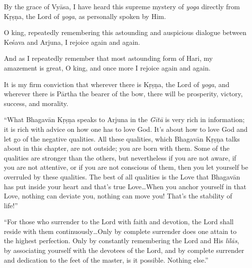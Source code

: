 {By the grace of Vyāsa, I have heard this supreme mystery of \textit{yoga} directly from Kṛṣṇa, the Lord of \textit{yoga}, as personally spoken by Him.}

{O king, repeatedly remembering this astounding and auspicious dialogue between Keśava and Arjuna, I rejoice again and again.}

{And as I repeatedly remember that most astounding form of Hari, my amazement is great, O king, and once more I rejoice again and again.}

{It is my firm conviction that wherever there is Kṛṣṇa, the Lord of \textit{yoga}, and wherever there is Pārtha the bearer of the bow, there will be prosperity, victory, success, and morality.}

\enquote{What Bhagavān Kṛṣṇa speaks to Arjuna in the \textit{Gītā} is very rich in information; it is rich with advice on how one has to love God. It’s about how to love God and let go of the negative qualities. All these qualities, which Bhagavān Kṛṣṇa talks about in this chapter, are not outside; you are born with them. Some of the qualities are stronger than the others, but nevertheless if you are not aware, if you are not attentive, or if you are not conscious of them, then you let yourself be overruled by these qualities. The best of all qualities is the Love that Bhagavān has put inside your heart and that’s true Love\ldots When you anchor yourself in that Love, nothing can deviate you, nothing can move you! That’s the stability of life!}

\enquote{For those who surrender to the Lord with faith and devotion, the Lord shall reside with them continuously\ldots Only by complete surrender does one attain to the highest perfection. Only by constantly remembering the Lord and His \textit{līlās}, by associating yourself with the devotees of the Lord, and by complete surrender and dedication to the feet of the master, is it possible. Nothing else.}
